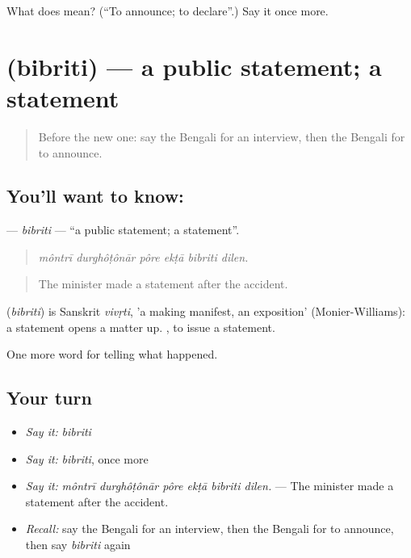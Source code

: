 \begin{tcolorbox}[breakable,colback=teal!4,colframe=teal!35!black,title={Before you move on}]
What does   mean? (\textquotedblleft{}To announce; to declare\textquotedblright{}.) Say it once more.
\end{tcolorbox}
\section[\texorpdfstring{\bn{বিবৃতি} (bibriti)}{বিবৃতি (bibriti)}]{ (bibriti) — a public statement; a statement}

\label{lesson:BN-C297-bibriti}



\begin{quote}
Before the new one: say the Bengali for an interview, then the Bengali for to announce.
\end{quote}

\subsection*{You'll want to know: }
\textbf{} — \emph{bibriti} — \textquotedblleft{}a public statement; a statement\textquotedblright{}.

\begin{quote}
     
\end{quote}

\begin{quote}
\emph{môntrī durghôṭônār pôre ekṭā bibriti dilen.}
\end{quote}

\begin{quote}
The minister made a statement after the accident.
\end{quote}

\begin{cousinweb}
\textbf{} (\emph{bibriti}) is Sanskrit \emph{vivṛti}, 'a making manifest, an exposition' (Monier-Williams): a statement opens a matter up.  , to issue a statement.
\end{cousinweb}

\begin{grammarlens}[title={What you've built}]
One more word for telling what happened.
\end{grammarlens}

\subsection*{Your turn}
\begin{itemize}
\raggedright
  \item \emph{Say it:} \emph{bibriti}
  \item \emph{Say it:} \emph{bibriti}, once more
  \item \emph{Say it:} \emph{môntrī durghôṭônār pôre ekṭā bibriti dilen.} — The minister made a statement after the accident.
  \item \emph{Recall:} say the Bengali for an interview, then the Bengali for to announce, then say \emph{bibriti} again
\end{itemize}

